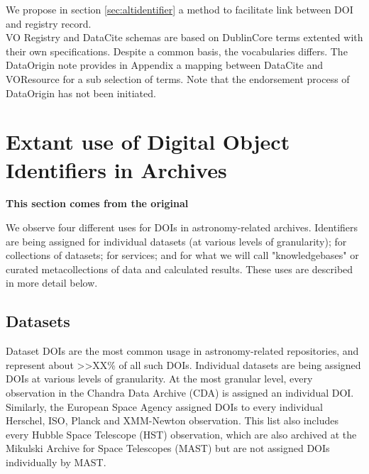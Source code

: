 \documentclass[11pt,a4paper]{ivoa}
\newcommand{\dataciteterm}[1]{\colorbox{lightgray}{DataCite:\textbf{#1}}}
\begin{document}
 
 
 We propose in section \ref{sec:altidentifier} a method to facilitate link between DOI and registry record.\\
 
VO Registry and DataCite schemas are based on DublinCore terms extented with their own specifications. Despite a common basis, the vocabularies differs. 
The DataOrigin note provides in Appendix a mapping between DataCite and VOResource for a sub selection of terms. Note that the endorsement process of DataOrigin has not been initiated.
 
 
\section{Extant use of Digital Object Identiﬁers in Archives}
\textbf{\color{red} This section comes from the original}

\label{sec:usage}
We observe four different uses for DOIs in astronomy-related archives.
Identifiers are being assigned for individual datasets (at various levels of granularity); for collections of datasets; for services; and for what we will call "knowledgebases" or curated metacollections of data and calculated results. 
These uses are described in more detail below.

\subsection{Datasets}
\label{sec:intro:datasets}

Dataset DOIs are the most common usage in astronomy-related repositories, and represent about >>XX\% of all such DOIs.
Individual datasets are being assigned DOIs at various levels of granularity. 
At the most granular level, every observation in the Chandra Data Archive (CDA) is assigned an individual DOI.
Similarly, the European Space Agency assigned DOIs to every individual Herschel, ISO, Planck and XMM-Newton observation. 
This list also includes every Hubble Space Telescope (HST) observation, which are also archived at the Mikulski Archive for Space Telescopes (MAST) but are not assigned DOIs individually by MAST.
\end{document}
